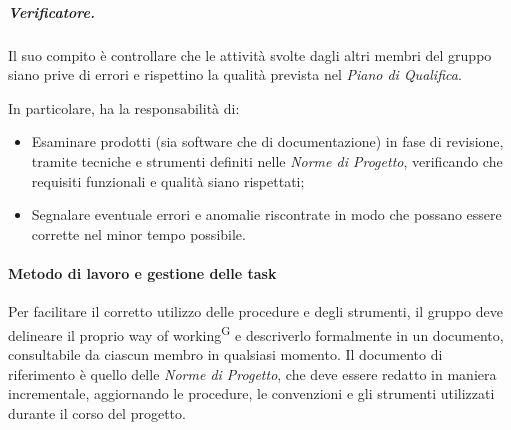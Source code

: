 \subparagraph{Verificatore.}
Il suo compito è controllare che le attività svolte dagli altri membri del gruppo siano prive di errori e rispettino la qualità prevista nel \textit{Piano di Qualifica}. %

In particolare, ha la responsabilità di:
\begin{itemize}
    \item Esaminare prodotti (sia software che di documentazione) in fase di revisione, tramite tecniche e strumenti definiti nelle \textit{Norme di Progetto}, verificando che requisiti funzionali e qualità siano rispettati;
    \item Segnalare eventuale errori e anomalie riscontrate in modo che possano essere corrette nel minor tempo possibile.
\end{itemize}

\paragraph{Metodo di lavoro e gestione delle task}
Per facilitare il corretto utilizzo delle procedure e degli strumenti, il gruppo deve delineare il proprio way of working\textsuperscript{G} e descriverlo formalmente in un documento, consultabile da ciascun membro in qualsiasi momento.  Il documento di riferimento è quello delle \textit{Norme di Progetto}, che deve essere redatto in maniera incrementale, aggiornando le procedure, le convenzioni e gli strumenti utilizzati durante il corso del progetto.

